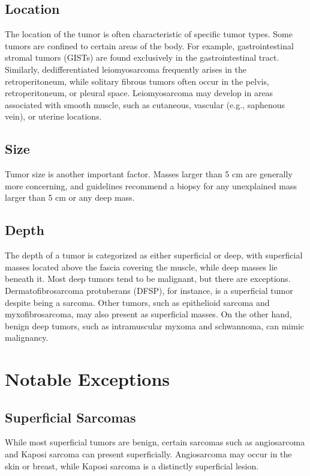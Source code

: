 \subsection{Location}
The location of the tumor is often characteristic of specific tumor types. Some tumors are confined to certain areas of the body. For example, gastrointestinal stromal tumors (GISTs) are found exclusively in the gastrointestinal tract. Similarly, dedifferentiated leiomyosarcoma frequently arises in the retroperitoneum, while solitary fibrous tumors often occur in the pelvis, retroperitoneum, or pleural space. Leiomyosarcoma may develop in areas associated with smooth muscle, such as cutaneous, vascular (e.g., saphenous vein), or uterine locations.

\subsection{Size}
Tumor size is another important factor. Masses larger than 5 cm are generally more concerning, and guidelines recommend a biopsy for any unexplained mass larger than 5 cm or any deep mass. 

\subsection{Depth}
The depth of a tumor is categorized as either superficial or deep, with superficial masses located above the fascia covering the muscle, while deep masses lie beneath it. Most deep tumors tend to be malignant, but there are exceptions. Dermatofibrosarcoma protuberans (DFSP), for instance, is a superficial tumor despite being a sarcoma. Other tumors, such as epithelioid sarcoma and myxofibrosarcoma, may also present as superficial masses. On the other hand, benign deep tumors, such as intramuscular myxoma and schwannoma, can mimic malignancy.

\section{Notable Exceptions}
\subsection{Superficial Sarcomas}
While most superficial tumors are benign, certain sarcomas such as angiosarcoma and Kaposi sarcoma can present superficially. Angiosarcoma may occur in the skin or breast, while Kaposi sarcoma is a distinctly superficial lesion.

